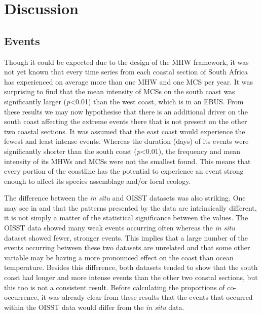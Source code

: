 \documentclass[a4paper,10pt,review]{elsarticle}
\begin{document}
\section{Discussion}

\subsection{Events}
Though it could be expected due to the design of the \citet{Hobday2016} MHW framework, it was not yet known that every time series from each coastal section of South Africa has experienced on average more than one MHW and one MCS per year. It was surprising to find that the mean intensity of MCSs on the south coast was significantly larger (\emph{p}<0.01) than the west coast, which is in an EBUS. From these results we may now hypothesise that there is an additional driver on the south coast affecting the extreme events there that is not present on the other two coastal sections. It was assumed that the east coast would experience the fewest and least intense events. Whereas the duration (days) of its events were significantly shorter than the south coast (\emph{p}<0.01), the frequency and mean intensity of its MHWs and MCSs were not the smallest found. This means that every portion of the coastline has the potential to experience an event strong enough to affect its species assemblage and/or local ecology.

The difference between the \emph{in situ} and OISST datasets was also striking. One may see in  and  that the patterns presented by the data are intrinsically different, it is not simply a matter of the statistical significance between the values. The OISST data showed many weak events occurring often whereas the \emph{in situ} dataset showed fewer, stronger events. This implies that a large number of the events occurring between these two datasets are unrelated and that some other variable may be having a more pronounced effect on the coast than ocean temperature. Besides this difference, both datasets tended to show that the south coast had longer and more intense events than the other two coastal sections, but this too is not a consistent result. Before calculating the proportions of co-occurrence, it was already clear from these results that the events that occurred within the OISST data would differ from the \emph{in situ} data.
\end{document}
